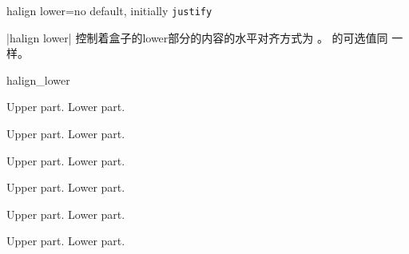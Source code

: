 \begin{docTcbKey}[][doc new=2015-05-07]{halign lower}{=}{no default, initially \texttt{justify}}
  
  |halign lower| 控制着盒子的lower部分的内容的水平对齐方式为 。 的可选值同  一样。
  
  
  \begin{exdispExample}{halign_lower}
  \begin{tcbraster}[raster columns=3,fonttitle=\bfseries,
  colback=red!5!white,colframe=red!75!black]
  
  \begin{tcolorbox}[adjusted title=flush center,halign lower=flush center]
    Upper part. \tcblower Lower part.
  \end{tcolorbox}
  \begin{tcolorbox}[adjusted title=flush left,halign lower=flush left]
    Upper part. \tcblower Lower part.
  \end{tcolorbox}
  \begin{tcolorbox}[adjusted title=flush right,halign lower=flush right]
    Upper part. \tcblower Lower part.
  \end{tcolorbox}
  \begin{tcolorbox}[adjusted title=center,halign lower=center]
    Upper part. \tcblower Lower part.
  \end{tcolorbox}
  \begin{tcolorbox}[adjusted title=left,halign lower=left]
    Upper part. \tcblower Lower part.
  \end{tcolorbox}
  \begin{tcolorbox}[adjusted title=right,halign lower=right]
    Upper part. \tcblower Lower part.
  \end{tcolorbox}
  
  \end{tcbraster}
  \end{exdispExample}
  \end{docTcbKey}
  

  



